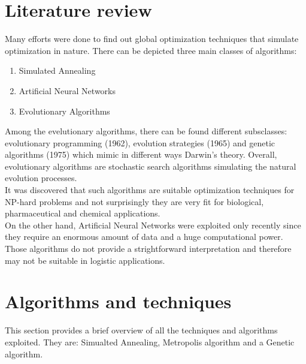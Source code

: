 \documentclass{article}
\begin{document}
\section{Literature review}
Many efforts were done to find out global optimization techniques that simulate optimization in nature. There can be depicted three main classes of algorithms:
\begin{enumerate}
\item Simulated Annealing
\item Artificial Neural Networks
\item Evolutionary Algorithms
\end{enumerate}
Among the evelutionary algorithms, there can be found different subsclasses: evolutionary programming (1962), evolution strategies (1965) and genetic algorithms (1975) which mimic in different ways Darwin's theory.  Overall, evolutionary algorithms are stochastic search algorithms simulating the natural evolution processes. \cite{gareview}\\
It was discovered that such algorithms are suitable optimization techniques for NP-hard problems and not surprisingly they are very fit for biological, pharmaceutical and chemical applications. \\
On the other hand, Artificial Neural Networks were exploited only recently since they require an enormous amount of data and a huge computational power. Those algorithms do not provide a strightforward interpretation and therefore may not be suitable in logistic applications. \cite{annreview}

\section{Algorithms and techniques} \label{algorithms}
This section provides a brief overview of all the techniques and algorithms exploited. They are: Simualted Annealing, Metropolis algorithm and a Genetic algorithm.
\end{document}
